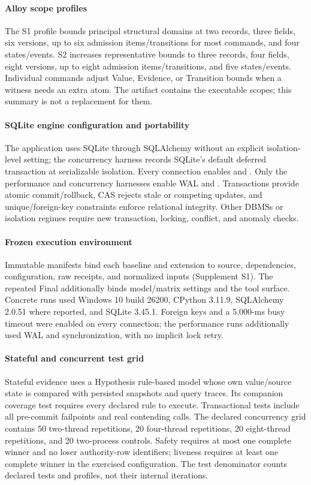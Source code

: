 
\paragraph{Alloy scope profiles}
The S1 profile bounds principal structural domains at two records, three fields, six versions, up to six admission items/transitions for most commands, and four states/events. S2 increases representative bounds to three records, four fields, eight versions, up to eight admission items/transitions, and five states/events. Individual commands adjust Value, Evidence, or Transition bounds when a witness needs an extra atom. The artifact contains the executable scopes; this summary is not a replacement for them.

\paragraph{SQLite engine configuration and portability}
The application uses SQLite through SQLAlchemy without an explicit isolation-level setting; the concurrency harness records SQLite's default deferred transaction at serializable isolation. Every connection enables  and . Only the performance and concurrency harnesses enable WAL and . Transactions provide atomic commit/rollback, CAS rejects stale or competing updates, and unique/foreign-key constraints enforce relational integrity. Other DBMSs or isolation regimes require new transaction, locking, conflict, and anomaly checks.

\paragraph{Frozen execution environment}
Immutable manifests bind each baseline and extension to source, dependencies, configuration, raw receipts, and normalized inputs (Supplement S1). The repeated Final additionally binds model/matrix settings and the tool surface. Concrete runs used Windows 10 build 26200, CPython 3.11.9, SQLAlchemy 2.0.51 where reported, and SQLite 3.45.1. Foreign keys and a 5,000-ms busy timeout were enabled on every connection; the performance runs additionally used WAL and  synchronization, with no implicit lock retry.

\paragraph{Stateful and concurrent test grid}
Stateful evidence uses a Hypothesis rule-based model whose own value/source state is compared with persisted snapshots and query traces. Its companion coverage test requires every declared rule to execute. Transactional tests include all pre-commit failpoints and real contending calls. The declared concurrency grid contains 50 two-thread repetitions, 20 four-thread repetitions, 20 eight-thread repetitions, and 20 two-process controls. Safety requires at most one complete winner and no loser authority-row identifiers; liveness requires at least one complete winner in the exercised configuration. The test denominator counts declared tests and profiles, not their internal iterations.

